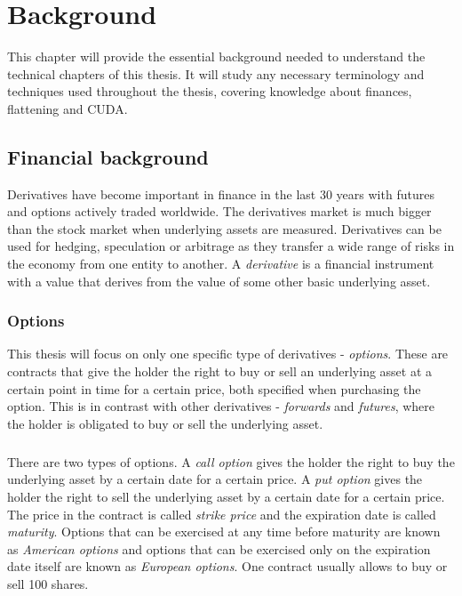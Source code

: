 \chapter{Background}
\label{chapter:background}
This chapter will provide the essential background needed to understand the technical chapters of this thesis. It will study any necessary terminology and techniques used throughout the thesis, covering knowledge about finances, flattening and CUDA.

\section{Financial background}
Derivatives have become important in finance in the last 30 years with futures and options actively traded worldwide. The derivatives market is much bigger than the stock market when underlying assets are measured. Derivatives can be used for hedging, speculation or arbitrage as they transfer a wide range of risks in the economy from one entity to another. A \textit{derivative} is a financial instrument with a value that derives from the value of some other basic underlying asset.~\cite[pg.1]{ofod}

\subsection{Options}
This thesis will focus on only one specific type of derivatives - \textit{options}. These are contracts that give the holder the right to buy or sell an underlying asset at a certain point in time for a certain price, both specified when purchasing the option. This is in contrast with other derivatives - \textit{forwards} and \textit{futures}, where the holder is obligated to buy or sell the underlying asset. 

\paragraph{}
There are two types of options. A \textit{call option} gives the holder the right to buy the underlying asset by a certain date for a certain price. A \textit{put option} gives the holder the right to sell the underlying asset by a certain date for a certain price. The price in the contract is called \textit{strike price} and the expiration date is called \textit{maturity}. Options that can be exercised at any time before maturity are known as \textit{American options} and options that can be exercised only on the expiration date itself are known as \textit{European options}. One contract usually allows to buy or sell 100 shares.~\cite[pg.7-8]{ofod}
